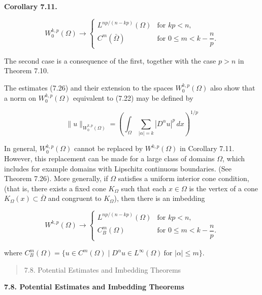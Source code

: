 \begin{corollary}\label{gt:cor-sobolev-embedding-higher-order}
\textbf{Corollary 7.11.}

\[
W_0^{k,p}(\Omega)\to
\begin{cases}
L^{np/(n-kp)}(\Omega) & \text{for } kp<n,\\
C^m(\bar{\Omega}) & \text{for } 0\le m<k-\dfrac{n}{p}.
\end{cases}
\]

The second case is a consequence of the first, together with the case $p>n$ in
Theorem 7.10.

The estimates (7.26) and their extension to the spaces $W_0^{k,p}(\Omega)$ also show that a
norm on $W_0^{k,p}(\Omega)$ equivalent to (7.22) may be defined by

\begin{equation}
\tag{7.29}
\|u\|_{W_0^{k,p}(\Omega)}=
\left(
\int_{\Omega}\sum_{|\alpha|=k}|D^\alpha u|^p\,dx
\right)^{1/p}
\end{equation}

In general, $W_0^{k,p}(\Omega)$ cannot be replaced by $W^{k,p}(\Omega)$ in Corollary 7.11. However,
this replacement can be made for a large class of domains $\Omega$, which includes for
example domains with Lipschitz continuous boundaries. (See Theorem 7.26).
More generally, if $\Omega$ satisfies a uniform interior cone condition, (that is, there
exists a fixed cone $K_\Omega$ such that each $x\in\Omega$ is the vertex of a cone $K_\Omega(x)\subset\bar{\Omega}$
and congruent to $K_\Omega$), then there is an imbedding

\[
W^{k,p}(\Omega)\to
\begin{cases}
L^{np/(n-kp)}(\Omega) & \text{for } kp<n,\\
C_{B}^{m}(\Omega) & \text{for } 0\le m<k-\dfrac{n}{p}.
\end{cases}
\]

where $C_B^m(\Omega)=\{u\in C^m(\Omega)\mid D^\alpha u\in L^\infty(\Omega)\ \text{for }|\alpha|\le m\}$.

\end{corollary}


\begin{quote}
7.8. Potential Estimates and Imbedding Theorems
\end{quote}

\begin{center}
\noindent\textbf{7.8. Potential Estimates and Imbedding Theorems}\label{gt:sec-potential-estimates}
\end{center}

